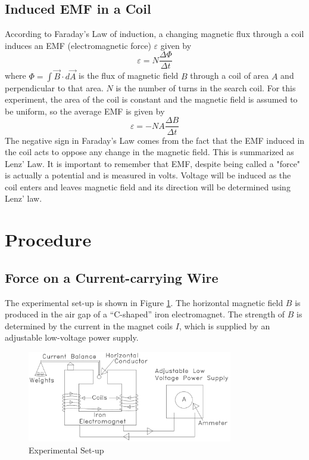 \subsection{Induced EMF in a Coil}
According to Faraday's Law of induction, a changing magnetic flux through a coil induces an EMF (electromagnetic force) $\varepsilon$ given by
\begin{equation}
 \varepsilon=N\frac{\Delta \Phi}{\Delta t}
\end{equation}
where $\Phi = \int \vec{B} \cdot d \vec{A}$ is the flux of magnetic field $B$ through a coil of area $A$ and perpendicular to that area. $N$ is the number of turns in the search coil. For this experiment, the area of the coil is constant and the magnetic field is assumed to be uniform, so the average EMF is given by
\begin{equation}
 \varepsilon= -NA\frac{\Delta B}{\Delta t}
 \label{eq:emf}
\end{equation}
The negative sign in Faraday's Law comes from the fact that the EMF induced in the coil acts to oppose any change in the magnetic field. This is summarized as Lenz' Law. It is important to remember that EMF, despite being called a "force" is actually a potential and is measured in volts. Voltage will be induced as the coil enters and leaves magnetic field and its direction will be determined using Lenz' law.

\section{Procedure}
\subsection{Force on a Current-carrying Wire}

The experimental set-up is shown in Figure {\ref{fig:set-up}}. The horizontal magnetic field $B$ is produced in the air gap of a ``C-shaped'' iron electromagnet. The strength of $B$ is determined by the current in the magnet coils $I$, which is supplied by an adjustable low-voltage power supply.\myskip
\begin{figure}[h]
\centering
\includegraphics[width=0.8\textwidth]{./Exp4/pic/image2.png}
\caption{Experimental Set-up}
\label{fig:set-up}
\end{figure}

